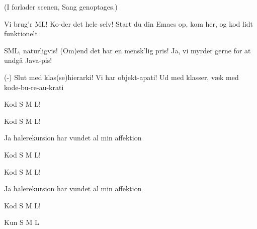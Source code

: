 \documentclass[a4paper,11pt]{article}
\begin{document}
\begin{song}
  (I forlader scenen, Sang genoptages.)

  Vi brug'r ML!
  Ko-der det hele selv!
  Start du din Emacs op, kom her, og kod lidt funktionelt

  SML, naturligvis!
  (Om)end det har en mensk'lig pris!
  Ja, vi myrder gerne for at undgå Java-pis!

  (-) Slut med klas(se)hierarki!
  Vi har objekt-apati!
  Ud med klasser, væk med kode-bu-re-au-krati

  Kod S M L!

  Kod S M L!

  Ja halerekursion har vundet al min affektion

  Kod S M L!

  Kod S M L!

  Ja halerekursion har vundet al min affektion

  Kod S M L!

  Kun S M L

\end{song}
\end{document}
